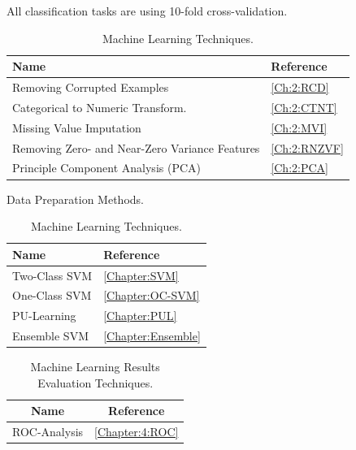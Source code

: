 All classification tasks are using 10-fold cross-validation. 


\begin{table}[ht!]
\centering
\setlength\tabcolsep{4pt}
\begin{minipage}{0.30\textwidth}
\centering
 \begin{tabular}{|l|l|}\hline
  Name&Reference\\ \hline
 Removing Corrupted Examples  & \ref{Ch:2:RCD} \\ \hline
        Categorical to Numeric Transform. & \ref{Ch:2:CTNT} \\
     \hline 
      Missing Value Imputation & \ref{Ch:2:MVI} \\
     \hline 
     
     Removing Zero- and Near-Zero Variance Features & \ref{Ch:2:RNZVF} \\
     \hline 

     Principle Component Analysis (PCA) & \ref{Ch:2:PCA} \\
     \hline 
        \end{tabular}
\caption{Data Preparation Methods.}
\label{tab:data-pred-methods} 
\end{minipage}%
\hfill
\begin{minipage}{0.24\textwidth}
\centering
 \begin{tabular}{|l|l|}\hline
         Name & Reference\\
        \hline
        Two-Class SVM & \ref{Chapter:SVM} \\
        \hline
        One-Class SVM & \ref{Chapter:OC-SVM} \\
        \hline
        PU-Learning &  \ref{Chapter:PUL} \\
        \hline
        Ensemble SVM &  \ref{Chapter:Ensemble} \\
        \hline
        
    \end{tabular}
 \caption{Machine Learning Techniques.} 
 \label{tab:machine-learn-tech} 
\end{minipage}
\end{table}

\begin{table}[ht!]
    \begin{center}
    \caption{Machine Learning Results Evaluation Techniques.}
    \label{tab:res-ev}
        \begin{tabular}{|c|c|}
        \hline
        Name&Reference\\
        \hline
        ROC-Analysis & \ref{Chapter:4:ROC} \\
        \hline
        \end{tabular}
\end{center}
\end{table}



